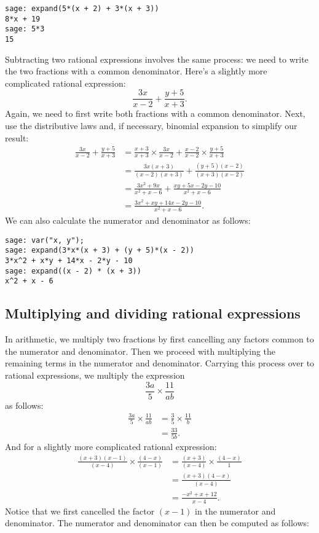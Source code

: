 \begin{lstlisting}
sage: expand(5*(x + 2) + 3*(x + 3))
8*x + 19
sage: 5*3
15
\end{lstlisting}

Subtracting two rational
expressions involves the same process: we need to write the two
fractions with a common denominator. Here's a slightly more
complicated rational expression:
\[
\frac{3x}{x - 2} + \frac{y + 5}{x + 3}.
\]
Again, we need to first write both fractions with a common
denominator. Next, use the distributive laws and, if necessary,
binomial expansion to simplify our result:
%
\begin{align*}
\frac{3x}{x - 2} + \frac{y + 5}{x + 3}
&=
\frac{x + 3}{x + 3} \times \frac{3x}{x - 2}
+
\frac{x - 2}{x - 2} \times \frac{y + 5}{x + 3} \\[4pt]
&=
\frac{3x(x + 3)}{(x - 2)(x + 3)}
+
\frac{(y + 5)(x - 2)}{(x + 3)(x - 2)} \\[4pt]
&=
\frac{3x^2 + 9x}{x^2 + x - 6} + \frac{xy + 5x - 2y - 10}{x^2 + x - 6} \\[4pt]
&=
\frac{3x^2 + xy + 14x - 2y - 10} {x^2 + x - 6}.
\end{align*}
%
We can also calculate the numerator and denominator as follows:

\begin{lstlisting}
sage: var("x, y");
sage: expand(3*x*(x + 3) + (y + 5)*(x - 2))
3*x^2 + x*y + 14*x - 2*y - 10
sage: expand((x - 2) * (x + 3))
x^2 + x - 6
\end{lstlisting}



\subsection{Multiplying and dividing rational expressions}

In arithmetic, we multiply two fractions by first cancelling any
factors common to the numerator and denominator. Then we proceed with
multiplying the remaining terms in the numerator and
denominator. Carrying this process over to rational expressions, we
multiply the expression
\[
\frac{3a}{5} \times \frac{11}{ab}
\]
as follows:
%
\begin{align*}
\frac{3a}{5} \times \frac{11}{ab}
&=
\frac{3}{5} \times \frac{11}{b} \\[4pt]
&=
\frac{33}{5b}.
\end{align*}
%
And for a slightly more complicated rational expression:
%
\begin{align*}
\frac{(x + 3) (x - 1)} {(x - 4)} \times \frac{(4 - x)} {(x - 1)}
&=
\frac{(x + 3)} {(x - 4)} \times \frac{(4 - x)} {1} \\[4pt]
&=
\frac{(x + 3)(4 - x)} {(x - 4)} \\[4pt]
&=
\frac{-x^2 + x + 12} {x - 4}.
\end{align*}
%
Notice that we first cancelled the factor $(x - 1)$ in the numerator
and denominator. The numerator and denominator can then be computed as
follows:

